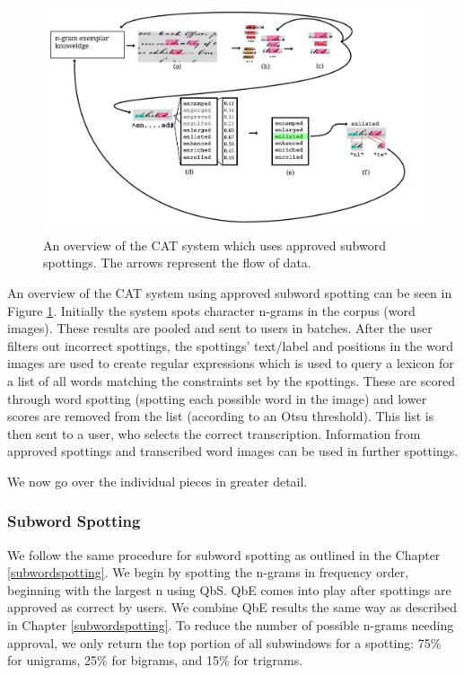 \documentclass[ms,electronic,twosidetoc,letterpaper,chaptercenter,parttop,lol,lof,lot]{byumsphd}
\begin{document}
\begin{figure}
    \centering
    \includegraphics[width=.9\textwidth]{flow6}
    \caption{An overview of the CAT system which uses approved subword spottings. The arrows represent the flow of data.}
    \label{fig:flow}
\end{figure}
An overview of the CAT system using approved subword spotting can be seen in Figure \ref{fig:flow}. Initially the system spots character n-grams in the corpus (word images). These results are pooled and sent to users in batches. After the user filters out incorrect spottings, the spottings' text/label and positions in the word images are used to create regular expressions which is used to query a lexicon for a list of all words matching the constraints set by the spottings. These are scored through word spotting (spotting each possible word in the image) and lower scores are removed from the list (according to an Otsu threshold). This list is then sent to a user, who selects the correct transcription. Information from approved spottings and transcribed word images can be used in further spottings.

We now go over the individual pieces in greater detail.

\subsubsection{Subword Spotting}
We follow the same procedure for subword spotting as outlined in the Chapter \ref{subwordspotting}. We begin by spotting the n-grams in frequency order, beginning with the largest n using QbS. QbE comes into play after spottings are approved as correct by users. We combine QbE results the same way as described in Chapter \ref{subwordspotting}.
To reduce the number of possible n-grams needing approval, we only return the top portion of all subwindows for a spotting: 75\% for unigrams, 25\% for bigrams, and 15\% for trigrams.
\end{document}

